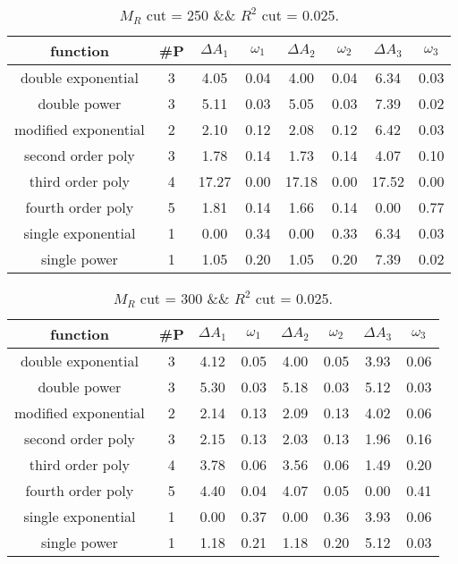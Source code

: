  
\begin{table}[H] 
\begin{center} 
\begin{tabular}{|c|c|cc|cc|cc|} 
\hline function & \#P & $\Delta A_1$ & $\omega_1$ & $\Delta A_2$ & $\omega_2$ & $\Delta A_3$ & $\omega_3$ \\ \hline 
double exponential &  3 &   4.05 &   0.04 &   4.00 &   0.04 &   6.34 &   0.03 \\ 
double power &  3 &   5.11 &   0.03 &   5.05 &   0.03 &   7.39 &   0.02 \\ 
modified exponential &  2 &   2.10 &   0.12 &   2.08 &   0.12 &   6.42 &   0.03 \\ 
second order poly &  3 &   1.78 &   0.14 &   1.73 &   0.14 &   4.07 &   0.10 \\ 
third order poly &  4 &  17.27 &   0.00 &  17.18 &   0.00 &  17.52 &   0.00 \\ 
fourth order poly &  5 &   1.81 &   0.14 &   1.66 &   0.14 &   0.00 &   0.77 \\ 
single exponential &  1 &   0.00 &   0.34 &   0.00 &   0.33 &   6.34 &   0.03 \\ 
single power &  1 &   1.05 &   0.20 &   1.05 &   0.20 &   7.39 &   0.02 \\ 
\hline 
\end{tabular} 
\caption{$M_R$ cut = 250 \&\& $R^2$ cut = 0.025.} 
\label{tab:FitChoices_250_0.025} 
\end{center} 
\end{table} 
 
 
\begin{table}[H] 
\begin{center} 
\begin{tabular}{|c|c|cc|cc|cc|} 
\hline function & \#P & $\Delta A_1$ & $\omega_1$ & $\Delta A_2$ & $\omega_2$ & $\Delta A_3$ & $\omega_3$ \\ \hline 
double exponential &  3 &   4.12 &   0.05 &   4.00 &   0.05 &   3.93 &   0.06 \\ 
double power &  3 &   5.30 &   0.03 &   5.18 &   0.03 &   5.12 &   0.03 \\ 
modified exponential &  2 &   2.14 &   0.13 &   2.09 &   0.13 &   4.02 &   0.06 \\ 
second order poly &  3 &   2.15 &   0.13 &   2.03 &   0.13 &   1.96 &   0.16 \\ 
third order poly &  4 &   3.78 &   0.06 &   3.56 &   0.06 &   1.49 &   0.20 \\ 
fourth order poly &  5 &   4.40 &   0.04 &   4.07 &   0.05 &   0.00 &   0.41 \\ 
single exponential &  1 &   0.00 &   0.37 &   0.00 &   0.36 &   3.93 &   0.06 \\ 
single power &  1 &   1.18 &   0.21 &   1.18 &   0.20 &   5.12 &   0.03 \\ 
\hline 
\end{tabular} 
\caption{$M_R$ cut = 300 \&\& $R^2$ cut = 0.025.} 
\label{tab:FitChoices_300_0.025} 
\end{center} 
\end{table} 
 
